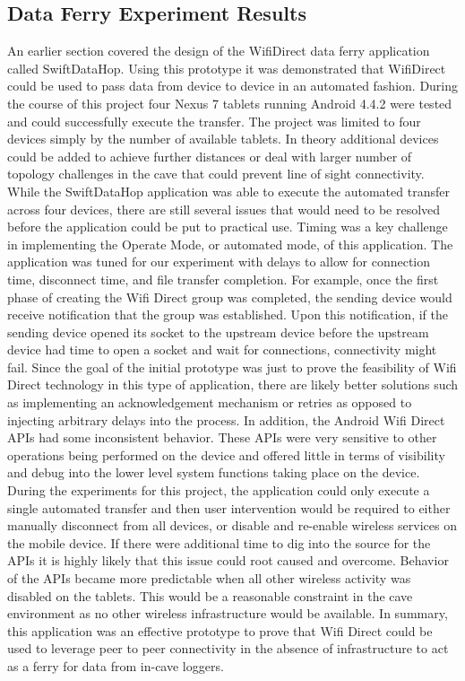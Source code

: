 \documentclass[10pt,twocolumn]{article}
\begin{document}
\subsection{Data Ferry Experiment Results}
An earlier section covered the design of the WifiDirect data ferry application called SwiftDataHop. 
Using this prototype it was demonstrated that WifiDirect could be used to pass data from device to device in an automated fashion. 
During the course of this project four Nexus 7 tablets running Android 4.4.2 were tested and could successfully execute the transfer.
The project was limited to four devices simply by the number of available tablets.
In theory additional devices could be added to achieve further distances or deal with larger number of topology challenges in the cave that could prevent line of sight connectivity. 
While the SwiftDataHop application was able to execute the automated transfer across four devices, there are still several issues that would need to be resolved before the application could be put to practical use.
Timing was a key challenge in implementing the Operate Mode, or automated mode, of this application.
The application was tuned for our experiment with delays to allow for connection time, disconnect time, and file transfer completion.
For example, once the first phase of creating the Wifi Direct group was completed, the sending device would receive notification that the group was established.  
Upon this notification, if the sending device opened its socket to the upstream device before the upstream device had time to open a socket and wait for connections, connectivity might fail.
Since the goal of the initial prototype was just to prove the feasibility of Wifi Direct technology in this type of application, there are likely better solutions such as implementing an acknowledgement mechanism or retries as opposed to injecting arbitrary delays into the process. 
In addition, the Android Wifi Direct APIs had some inconsistent behavior.
These APIs were very sensitive to other operations being performed on the device and offered little in terms of visibility and debug into the lower level system functions taking place on the device.
During the experiments for this project, the application could only execute a single automated transfer and then user intervention would be required to either manually disconnect from all devices, or disable and re-enable wireless services on the mobile device.
If there were additional time to dig into the source for the APIs it is highly likely that this issue could root caused and overcome.
Behavior of the APIs became more predictable when all other wireless activity was disabled on the tablets.
This would be a reasonable constraint in the cave environment as no other wireless infrastructure would be available.
In summary, this application was an effective prototype to prove that Wifi Direct could be used to leverage peer to peer connectivity in the absence of infrastructure to act as a ferry for data from in-cave loggers.
\end{document}
